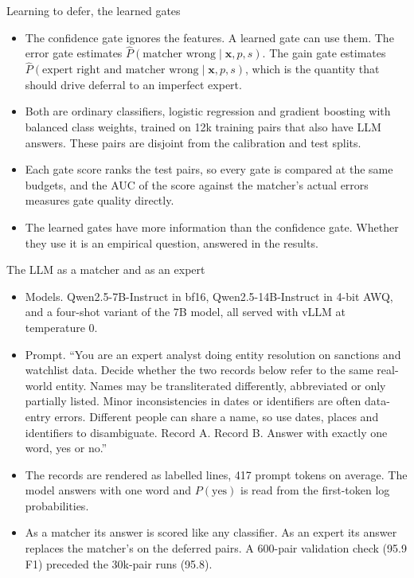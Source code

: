 \documentclass[aspectratio=169,10pt]{beamer}
\begin{document}
\begin{frame}{Learning to defer, the learned gates}
\begin{itemize}
\item The confidence gate ignores the features. A learned gate can use them. The error gate estimates $\hat P(\text{matcher wrong}\mid\mathbf{x},p,s)$. The gain gate estimates $\hat P(\text{expert right and matcher wrong}\mid\mathbf{x},p,s)$, which is the quantity that should drive deferral to an imperfect expert.
\item Both are ordinary classifiers, logistic regression and gradient boosting with balanced class weights, trained on 12k training pairs that also have LLM answers. These pairs are disjoint from the calibration and test splits.
\item Each gate score ranks the test pairs, so every gate is compared at the same budgets, and the AUC of the score against the matcher's actual errors measures gate quality directly.
\item The learned gates have more information than the confidence gate. Whether they use it is an empirical question, answered in the results.
\end{itemize}
\end{frame}

\begin{frame}{The LLM as a matcher and as an expert}
\begin{itemize}
\item Models. Qwen2.5-7B-Instruct in bf16, Qwen2.5-14B-Instruct in 4-bit AWQ, and a four-shot variant of the 7B model, all served with vLLM at temperature 0.
\item Prompt. ``You are an expert analyst doing entity resolution on sanctions and watchlist data. Decide whether the two records below refer to the same real-world entity. Names may be transliterated differently, abbreviated or only partially listed. Minor inconsistencies in dates or identifiers are often data-entry errors. Different people can share a name, so use dates, places and identifiers to disambiguate. Record A. Record B. Answer with exactly one word, yes or no.''
\item The records are rendered as labelled lines, 417 prompt tokens on average. The model answers with one word and $P(\text{yes})$ is read from the first-token log probabilities.
\item As a matcher its answer is scored like any classifier. As an expert its answer replaces the matcher's on the deferred pairs. A 600-pair validation check (95.9 F1) preceded the 30k-pair runs (95.8).
\end{itemize}
\end{frame}
\end{document}
